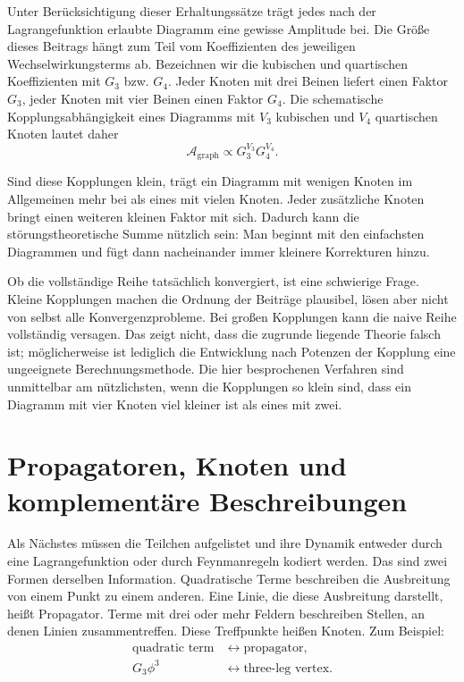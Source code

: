 Unter Berücksichtigung dieser Erhaltungssätze trägt jedes nach der Lagrangefunktion erlaubte Diagramm eine gewisse Amplitude bei. Die Größe dieses Beitrags hängt zum Teil vom Koeffizienten des jeweiligen Wechselwirkungsterms ab. Bezeichnen wir die kubischen und quartischen Koeffizienten mit \(G_3\) bzw. \(G_4\). Jeder Knoten mit drei Beinen liefert einen Faktor \(G_3\), jeder Knoten mit vier Beinen einen Faktor \(G_4\). Die schematische Kopplungsabhängigkeit eines Diagramms mit \(V_3\) kubischen und \(V_4\) quartischen Knoten lautet daher
\begin{equation}
\mathcal{A}_{\mathrm{graph}}
\propto G_3^{V_3}G_4^{V_4}.
\end{equation}

Sind diese Kopplungen klein, trägt ein Diagramm mit wenigen Knoten im Allgemeinen mehr bei als eines mit vielen Knoten. Jeder zusätzliche Knoten bringt einen weiteren kleinen Faktor mit sich. Dadurch kann die störungstheoretische Summe nützlich sein: Man beginnt mit den einfachsten Diagrammen und fügt dann nacheinander immer kleinere Korrekturen hinzu.

Ob die vollständige Reihe tatsächlich konvergiert, ist eine schwierige Frage. Kleine Kopplungen machen die Ordnung der Beiträge plausibel, lösen aber nicht von selbst alle Konvergenzprobleme. Bei großen Kopplungen kann die naive Reihe vollständig versagen. Das zeigt nicht, dass die zugrunde liegende Theorie falsch ist; möglicherweise ist lediglich die Entwicklung nach Potenzen der Kopplung eine ungeeignete Berechnungsmethode. Die hier besprochenen Verfahren sind unmittelbar am nützlichsten, wenn die Kopplungen so klein sind, dass ein Diagramm mit vier Knoten viel kleiner ist als eines mit zwei.

\begin{classroomqa}
\end{classroomqa}

\section{Propagatoren, Knoten und komplementäre Beschreibungen}

Als Nächstes müssen die Teilchen aufgelistet und ihre Dynamik entweder durch eine Lagrangefunktion oder durch Feynmanregeln kodiert werden. Das sind zwei Formen derselben Information. Quadratische Terme beschreiben die Ausbreitung von einem Punkt zu einem anderen. Eine Linie, die diese Ausbreitung darstellt, heißt Propagator. Terme mit drei oder mehr Feldern beschreiben Stellen, an denen Linien zusammentreffen. Diese Treffpunkte heißen Knoten. Zum Beispiel:
\begin{equation}
\begin{aligned}
\text{quadratic term}
&\longleftrightarrow \text{propagator},\\
G_3\phi^3
&\longleftrightarrow \text{three-leg vertex}.
\end{aligned}
\end{equation}

